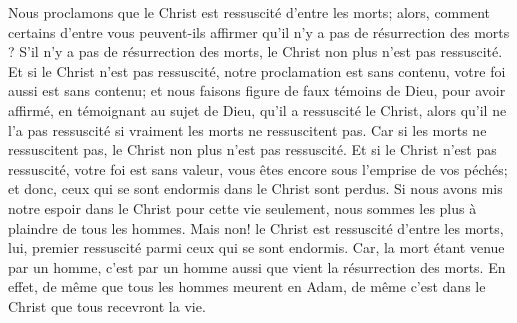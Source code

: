 Nous proclamons que le Christ est ressuscité d’entre les morts;
	alors, comment certains d’entre vous peuvent-ils affirmer
		qu’il n’y a pas de résurrection des morts ?
S’il n’y a pas de résurrection des morts,
	le Christ non plus n’est pas ressuscité.
Et si le Christ n’est pas ressuscité,
	notre proclamation est sans contenu, votre foi aussi est sans contenu;
	et nous faisons figure de faux témoins de Dieu,
	pour avoir affirmé, en témoignant au sujet de Dieu,
		qu’il a ressuscité le Christ,
	alors qu’il ne l’a pas ressuscité si vraiment les morts ne ressuscitent pas.
Car si les morts ne ressuscitent pas,
	le Christ non plus n’est pas ressuscité.
Et si le Christ n’est pas ressuscité, votre foi est sans valeur,
	vous êtes encore sous l’emprise de vos péchés;
	et donc, ceux qui se sont endormis dans le Christ sont perdus.
Si nous avons mis notre espoir dans le Christ pour cette vie seulement,
	nous sommes les plus à plaindre de tous les hommes.
Mais non! le Christ est ressuscité d’entre les morts,
	lui, premier ressuscité parmi ceux qui se sont endormis.
Car, la mort étant venue par un homme,
	c’est par un homme aussi que vient la résurrection des morts.
En effet, de même que tous les hommes meurent en Adam,
	de même c’est dans le Christ que tous recevront la vie.
